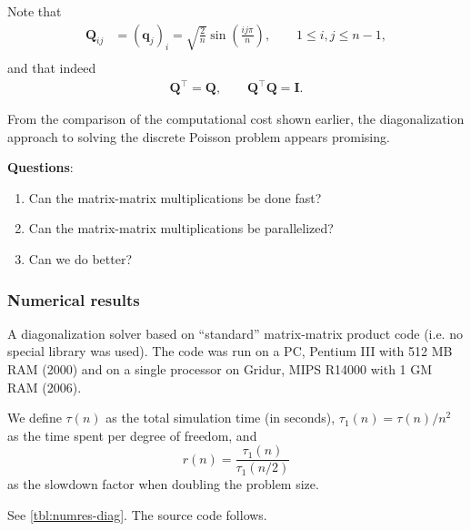 Note that
\begin{align*}
 \bm Q_{ij}
  &= (\bm q_j)_i = \sqrt{\frac{2}{n}} \sin \left( \frac{ij \pi}{n} \right),
    \qquad 1 \leq i,j \leq n-1, \\
\end{align*}
and that indeed
\begin{align*}
  \bm Q^\intercal = \bm Q, \qquad \bm Q^\intercal \bm Q = \bm I.
\end{align*}

From the comparison of the computational cost shown earlier, the diagonalization
approach to solving the discrete Poisson problem appears promising.

\textbf{Questions}:
\begin{enumerate}
\item Can the matrix-matrix multiplications be done fast?
\item Can the matrix-matrix multiplications be parallelized?
\item Can we do better?
\end{enumerate}

\subsubsection{Numerical results}

A diagonalization solver based on ``standard'' matrix-matrix product code (i.e.
no special library was used). The code was run on a PC, Pentium III with 512 MB
RAM (2000) and on a single processor on Gridur, MIPS R14000 with 1 GM RAM
(2006).

We define $\tau(n)$ as the total simulation time (in seconds), $\tau_1(n) =
\tau(n)/n^2$ as the time spent per degree of freedom, and
\[
  r(n) = \frac{\tau_1(n)}{\tau_1(n/2)}
\]
as the slowdown factor when doubling the problem size.

See \autoref{tbl:numres-diag}. The source code follows.

